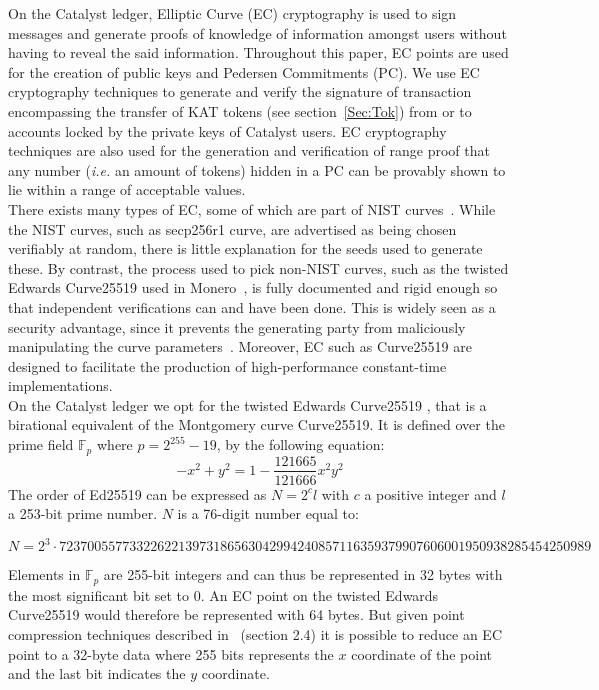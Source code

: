 On the Catalyst ledger, Elliptic Curve (EC) cryptography is used to sign messages and generate proofs of knowledge of information amongst users without having to reveal the said information. Throughout this paper, EC points are used for the creation of public keys and Pedersen Commitments (PC). We use EC cryptography techniques to generate and verify the signature of transaction encompassing the transfer of KAT tokens (see section~\ref{Sec:Tok}) from or to accounts locked by the private keys of Catalyst users. EC cryptography techniques are also used for the generation and verification of range proof that any number (\textit{i.e.} an amount of tokens) hidden in a PC can be provably shown to lie within a range of acceptable values.\\
 
There exists many types of EC, some of which are part of NIST curves~\cite{Hankerson2011}. While the NIST curves, such as secp256r1 curve, are advertised as being chosen verifiably at random, there is little explanation for the seeds used to generate these. By contrast, the process used to pick non-NIST curves, such as the twisted Edwards Curve25519 used in Monero~\cite{monero}, is fully documented and rigid enough so that independent verifications can and have been done. This is widely seen as a security advantage, since it prevents the generating party from maliciously manipulating the curve parameters~\cite{NSA}. Moreover, EC such as Curve25519 are designed to facilitate the production of high-performance constant-time implementations. \\

On the Catalyst ledger we opt for the twisted Edwards Curve25519 \cite{ed25519}, that is a birational equivalent of the Montgomery curve Curve25519. It is defined over the prime field $\mathbb{F}_{p}$ where $p = 2^{255} - 19$, by the following equation:
\begin{equation}
-x^2+y^2=1-\frac{121665}{121666}x^2y^2
\end{equation}
The order of Ed25519 can be expressed as $N=2^cl$ with $c$ a positive integer and $l$ a 253-bit prime number. $N$ is a 76-digit number equal to:
\begin{center}
\begin{footnotesize}
$N=2^3\cdot 7237005577332262213973186563042994240857116359379907606001950938285454250989$
\end{footnotesize}
\end{center}

Elements in $\mathbb{F}_{p}$ are 255-bit integers and can thus be represented in 32 bytes with the most significant bit set to 0. An EC point on the twisted Edwards Curve25519 would therefore be represented with 64 bytes. But given point compression techniques described in~\cite{monero} (section 2.4) it is possible to reduce an EC point to a 32-byte data where 255 bits represents the $x$ coordinate of the point and the last bit indicates the $y$ coordinate. \\

